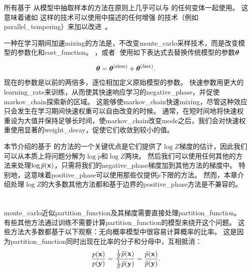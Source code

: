 所有基于\,\,从模型中抽取样本的方法在原则上几乎可以与\,\,的任何变体一起使用。
这意味着诸如\,\,这样的技术可以使用中描述的任何增强\,\,的技术（例如\gls{parallel_tempering}）来加以改进~\citep{desjardins2010tempered,Cho10IJCNN-small}。

一种在学习期间加速\gls{mixing}的方法是，不改变\gls{monte_carlo}采样技术，而是改变模型的参数化和\gls{cost_function}。
，或者\,~\citep{TielemanT2009-small}使用如下表达式去替换传统模型的参数$\boldsymbol{\theta}$

\begin{equation}
	\boldsymbol{\theta} = \boldsymbol{\theta}^{\text{(slow)}} + \boldsymbol{\theta}^{\text{(fast)}}.
\end{equation}
现在的参数是以前的两倍多，逐位相加定义原始模型的参数。
快速参数用更大的\gls{learning_rate}来训练，从而使其快速响应学习的\gls{negative_phase}，并促使\gls{markov_chain}探索新的区域。
这能够使\gls{markov_chain}快速\gls{mixing}，尽管这种效应只会发生在学习期间快速权重可以自由改变的时候。
通常，在短时间地将快速权重设为大值并保持足够长时间，使\gls{markov_chain}改变\gls{mode}之后，我们会对快速权重使用显著的\gls{weight_decay}，促使它们收敛到较小的值。


本节介绍的基于\,\,的方法的一个关键优点是它们提供了$\log Z$梯度的估计，因此我们可以从本质上将问题分解为$\log \tilde{p}$和$\log Z$两块。
然后我们可以使用任何其他的方法来处理$\log \tilde{p}(\mathbf{x})$，只需将我们的\gls{negative_phase}梯度加到其他方法的梯度中。
特别地，这意味着\gls{positive_phase}可以使用那些仅提供$\tilde{p}$下限的方法。
然而，本章介绍处理$\log Z$的大多数其他方法都和基于边界的\gls{positive_phase}方法是不兼容的。


\section{}
\label{sec:pseudolikelihood}
\gls{monte_carlo}近似\gls{partition_function}及其梯度需要直接处理\gls{partition_function}。
有些其他方法通过训练不需要计算\gls{partition_function}的模型来绕开这个问题。
这些方法大多数都基于以下观察：无向概率模型中很容易计算概率的比率。
这是因为\gls{partition_function}同时出现在比率的分子和分母中，互相抵消：
\begin{equation}
	\frac{p(\mathbf{x})}{ p(\mathbf{y}) } = \frac{ \frac{1}{Z} \tilde{p}(\mathbf{x}) }{ \frac{1}{Z} \tilde{p}(\mathbf{y}) } =
\frac{ \tilde{p}(\mathbf{x}) }{ \tilde{p}(\mathbf{y}) }.
\end{equation}


